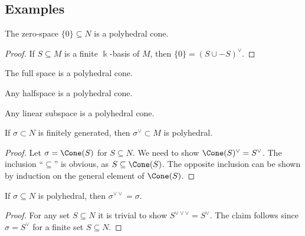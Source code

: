 \subsection{Examples}

\begin{proposition}
  \label{bot-polyhedral}
  The zero-space \( \{0\} \subseteq N \) is a polyhedral cone.
\end{proposition}
\begin{proof}
  \uses{}
  If \( S \subseteq M \) is a finite \( \Bbbk \)-basis of \( M \),
  then \( \{0\} = (S \cup -S)^\vee \).
\end{proof}

\begin{proposition}
  \label{all-polyhedral-cone}
  The full space is a polyhedral cone.
\end{proposition}

\begin{proposition}
  \label{halfspace-polyhedral-cone}
  Any halfspace is a polyhedral cone.
\end{proposition}

\begin{proposition}
  \label{linear-subspace-polyhedral-cone}
  Any linear subspace is a polyhedral cone.
\end{proposition}


\begin{proposition}
  \label{dual-polyhedral}
  If \( \sigma \subset N \) is finitely generated, then \( \sigma^\vee
  \subset M \) is polyhedral.
\end{proposition}
\begin{proof}
  \uses{}
  Let \( \sigma = \Cone(S) \) for \( S \subseteq N \). We need to show
  \( \Cone(S)^\vee = S^\vee \). The inclusion ``\( \subseteq \)'' is
  obvious, as \( S \subseteq \Cone(S) \). The opposite inclusion can
  be shown by induction on the general element of \( \Cone(S) \).
\end{proof}

\begin{proposition}
  \label{double-dual-polyhedral-cone}
  If \( \sigma \subseteq N \) is polyhedral, then \( \sigma^{\vee\vee}
  = \sigma \).
\end{proposition}
\begin{proof}
  \uses{}
  For any set \( S \subseteq N \) it is trivial to show \(
  S^{\vee\vee\vee} = S^{\vee} \). The claim follows since \( \sigma =
  S^{\vee} \) for a finite set \( S \subseteq N \).
\end{proof}


